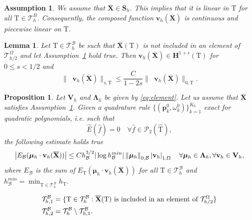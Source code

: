 \documentclass[10pt,a4paper]{amsart}
\newtheorem{assump}{Assumption}
\newtheorem{lem}{Lemma}
\newtheorem{prop}{Proposition}
\newcommand\B{\mathcal B} %
\newcommand\BD{\end{color}}
\newcommand\DB{\begin{color}{black}}
\renewcommand\H{\mathbf{H}}
\newcommand\LL{{\boldsymbol{\Lambda}}} %
\newcommand\Pcal{\mathcal{P}}
\renewcommand\S{\mathbf{S}} %
\newcommand\Sline{\S} %
\newcommand\T{\mathcal{T}} %
\newcommand\Vline{\mathbf{V}} %
\newcommand\X{\mathbf{X}} %
\newcommand\Xbar{\overline{\X}} %
\newcommand{\abs}[1]{\left\lvert#1\right\rvert}
\DeclareMathOperator{\grads}{\boldsymbol\nabla_s}
\newcommand\mmu{{\boldsymbol\mu}} %
\newcommand{\norm}[1]{\left\lVert#1\right\rVert}
\newcommand\quadnode{\mathbf{p}}
\newcommand\quadweigth{\omega}
\newcommand\reftri{\widehat{\tri}} %
\newcommand\tri{\mathrm{T}} %
\renewcommand\v{\mathbf{v}} %
\begin{document}
	\begin{assump}\label{assum:xbar}	
		We assume that $\Xbar\in\Sline_h$. This implies that it is linear in $\tri$ for all $\tri\in\T_h^B$. Consequently, the composed function
		$\v_h(\Xbar)$ is continuous and piecewise linear on
		$\tri$.
	\end{assump} 

	\begin{lem}
		Let $\tri\in\T_h^\B$ be such that $\Xbar(\tri)$ is not included in an element of
		$\T_{h/2}^\Omega$ and let Assumption~\ref{assum:xbar} hold true. Then $\v_h(\Xbar)\in \H^{1+s}(\tri)$ for $0\le s<1/2$ and 
		\[
		\|\grads\v_h(\Xbar)\|_{s,\tri}\le \frac{C}{1-2s} \|\grads\v_h(\Xbar)\|_{0,\tri}.
		\]
		\label{le:duran}
	\end{lem}

	\begin{prop}\label{prop:l2_quad_error}
		Let $\Vline_h$ and $\LL_h$ be given by \eqref{eq:element}. Let us assume that $\Xbar$ satisfies Assumption~\ref{assum:xbar}.
		Given a quadrature rule $\{(\quadnode_k^0,\quadweigth_k^0)\}_{k=1}^{K_0}$ exact for quadratic polynomials, i.e. such that
		\begin{equation}\label{eq:quadr}
			\widehat{E}(\widehat{f}) = 0 \quad\forall\widehat{f}\in\Pcal_2(\reftri),
		\end{equation}
		the following estimate holds true %
		\begin{equation}\label{eq:l2_quad_error}
			\abs{E_\B(\mmu_h\cdot\v_h(\Xbar))}
			\le
			C h_\B^{3/2}|\log h_\B^{min}|
			\norm{\mmu_h}_{0,\B}\DB\abs{\v_h}_{1,\Omega}\BD
			\quad\forall\mmu_h\in\LL_h,\forall\v_h\in\Vline_h,
		\end{equation}
		where $E_\B$ is the sum of $E_\tri(\mmu_h\cdot\v_h(\Xbar))$ for all $\tri\in\T_h^\B$ and  $h_\B^{min}=\min_{\tri\in\T_h^\B} h_\tri$. 
	\end{prop}

		\begin{equation}\label{eq:solid_mesh_partition}
			\begin{aligned}
				&\T_{h,1}^\B = \{\tri\in\T_h^\B:\DB\Xbar(\tri)\BD\text{ is included in an element of }
				\T_{h/2}^\Omega\}
				\\
				&\T_{h,2}^\B = \T_h^\B \setminus \T_{h,1}^\B.
			\end{aligned}
		\end{equation}
\end{document}
